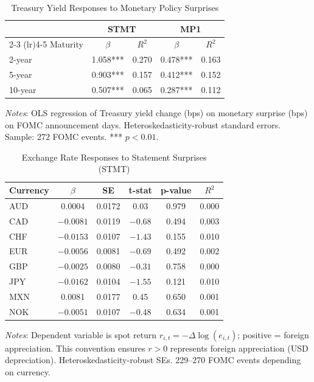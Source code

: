 \documentclass[12pt]{article}
\begin{document}
\begin{table}
\centering
\caption{Treasury Yield Responses to Monetary Policy Surprises}
\label{tab:treasury_response}
\begin{tabular}{lcccc}
\toprule
& \multicolumn{2}{c}{STMT} & \multicolumn{2}{c}{MP1} \\
\cmidrule(lr){2-3} \cmidrule(lr){4-5}
Maturity & $\beta$ & $R^2$ & $\beta$ & $R^2$ \\
\midrule
2-year & 1.058*** & 0.270 & 0.478*** & 0.163 \\
5-year & 0.903*** & 0.157 & 0.412*** & 0.152 \\
10-year & 0.507*** & 0.065 & 0.287*** & 0.112 \\
\bottomrule
\end{tabular}
\begin{flushleft}
\footnotesize \textit{Notes}: OLS regression of Treasury yield change (bps) on monetary surprise (bps) on FOMC announcement days. Heteroskedasticity-robust standard errors. Sample: 272 FOMC events. *** $p<0.01$.
\end{flushleft}
\end{table}

\begin{table}
\centering
\caption{Exchange Rate Responses to Statement Surprises (STMT)}
\label{tab:fx_response}
\begin{tabular}{lccccc}
\toprule
Currency & $\beta$ & SE & t-stat & p-value & $R^2$ \\
\midrule
AUD & 0.0004 & 0.0172 & 0.03 & 0.979 & 0.000 \\
CAD & $-0.0081$ & 0.0119 & $-0.68$ & 0.494 & 0.003 \\
CHF & $-0.0153$ & 0.0107 & $-1.43$ & 0.155 & 0.010 \\
EUR & $-0.0056$ & 0.0081 & $-0.69$ & 0.492 & 0.002 \\
GBP & $-0.0025$ & 0.0080 & $-0.31$ & 0.758 & 0.000 \\
JPY & $-0.0162$ & 0.0104 & $-1.55$ & 0.121 & 0.010 \\
MXN & 0.0081 & 0.0177 & 0.45 & 0.650 & 0.001 \\
NOK & $-0.0051$ & 0.0107 & $-0.48$ & 0.634 & 0.001 \\
\bottomrule
\end{tabular}
\begin{flushleft}
\footnotesize \textit{Notes}: Dependent variable is spot return $r_{i,t} = -\Delta\log(e_{i,t})$; positive = foreign appreciation. This convention ensures $r > 0$ represents foreign appreciation (USD depreciation). Heteroskedasticity-robust SEs. 229--270 FOMC events depending on currency.
\end{flushleft}
\end{table}
\end{document}
